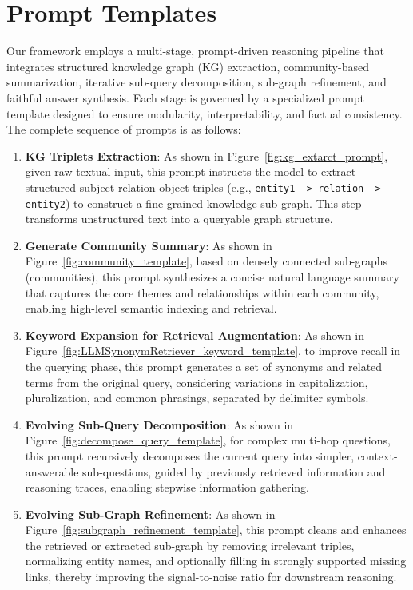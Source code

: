 \section{Prompt Templates}
\label{appendix:prompts}

Our framework employs a multi-stage, prompt-driven reasoning pipeline that integrates structured knowledge graph (KG) extraction, community-based summarization, iterative sub-query decomposition, sub-graph refinement, and faithful answer synthesis. Each stage is governed by a specialized prompt template designed to ensure modularity, interpretability, and factual consistency. The complete sequence of prompts is as follows:

\begin{enumerate}
\item \textbf{KG Triplets Extraction}: As shown in Figure~\ref{fig:kg_extarct_prompt}, given raw textual input, this prompt instructs the model to extract structured subject-relation-object triples (e.g., \texttt{entity1 -> relation -> entity2}) to construct a fine-grained knowledge sub-graph. This step transforms unstructured text into a queryable graph structure.

\item \textbf{Generate Community Summary}: As shown in Figure~\ref{fig:community_template}, based on densely connected sub-graphs (communities), this prompt synthesizes a concise natural language summary that captures the core themes and relationships within each community, enabling high-level semantic indexing and retrieval.

\item \textbf{Keyword Expansion for Retrieval Augmentation}: As shown in Figure~\ref{fig:LLMSynonymRetriever_keyword_template}, to improve recall in the querying phase, this prompt generates a set of synonyms and related terms from the original query, considering variations in capitalization, pluralization, and common phrasings, separated by delimiter symbols.

\item \textbf{Evolving Sub-Query Decomposition}: As shown in Figure~\ref{fig:decompose_query_template}, for complex multi-hop questions, this prompt recursively decomposes the current query into simpler, context-answerable sub-questions, guided by previously retrieved information and reasoning traces, enabling stepwise information gathering.

\item \textbf{Evolving Sub-Graph Refinement}: As shown in Figure~\ref{fig:subgraph_refinement_template}, this prompt cleans and enhances the retrieved or extracted sub-graph by removing irrelevant triples, normalizing entity names, and optionally filling in strongly supported missing links, thereby improving the signal-to-noise ratio for downstream reasoning.


\end{enumerate}
